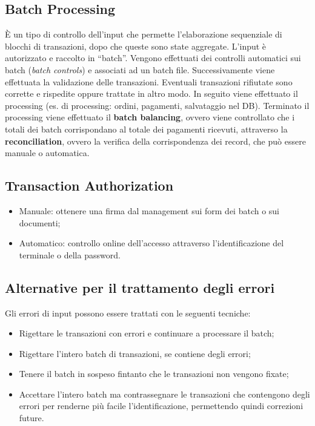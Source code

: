 \subsection{Batch Processing}
È un tipo di controllo dell'input che permette l'elaborazione sequenziale di
blocchi di transazioni, dopo che queste sono state aggregate. L'input è
autorizzato e raccolto in ``batch''. Vengono effettuati dei controlli
automatici sui batch  (\textit{batch controls}) e associati ad un batch file.
Successivamente viene effettuata la validazione delle transazioni. Eventuali
transazioni rifiutate sono corrette e rispedite oppure trattate in altro modo.
In seguito viene effettuato il processing (es. di processing: ordini,
pagamenti, salvataggio nel DB). Terminato il processing viene effettuato il
\textbf{batch balancing}, ovvero viene controllato che i totali dei batch
corrispondano al totale dei pagamenti ricevuti, attraverso la
\textbf{reconciliation}, ovvero la verifica della corrispondenza dei record,
che può essere manuale o automatica.

\subsection{Transaction Authorization}
\begin{itemize}
    \item Manuale: ottenere una firma dal management sui form dei batch o sui
    documenti;
    \item Automatico: controllo online dell'accesso attraverso
    l'identificazione del terminale o della password.
\end{itemize}

\subsection{Alternative per il trattamento degli errori}
Gli errori di input possono essere trattati
con le seguenti tecniche:
\begin{itemize}
\item Rigettare le transazioni con errori e continuare a processare
il batch;
\item Rigettare l'intero batch di transazioni, se contiene
degli errori;
\item Tenere il batch in sospeso fintanto che le transazioni
non vengono fixate;
\item Accettare l'intero batch ma contrassegnare le transazioni che
contengono degli errori per renderne più facile l'identificazione,
permettendo quindi correzioni future.
\end{itemize}


